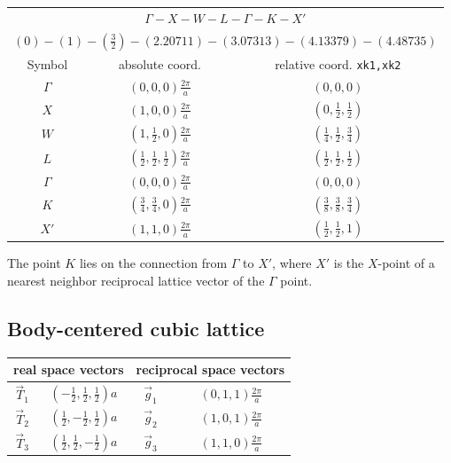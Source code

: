 \documentclass[final,12pt,makeidx,DIV=calc]{article}
\begin{document}
{{{\begin{center}
\renewcommand\arraystretch{1.5}
\begin{tabular}{|c|c|c|}
\hline
\multicolumn{3}{|c|}{$\Gamma-X-W-L-\Gamma-K-X'$}\\
\multicolumn{3}{|c|}{$(0)-(1)-(\frac{3}{2})-(2.20711)-(3.07313)-(4.13379)-(4.48735)$}\\
\hline
Symbol & absolute coord. & relative coord. \texttt{xk1,xk2}\\
\hline
$\Gamma$   & $(0,0,0) \frac{2\pi}{a}$ & $(0,0,0)$ \\ 
$X$        & $(1,0,0) \frac{2\pi}{a}$ & $(0,\frac{1}{2},\frac{1}{2})$ \\ 
$W$        & $(1,\frac{1}{2},0) \frac{2\pi}{a}$ & $(\frac{1}{4},\frac{1}{2},\frac{3}{4})$ \\ 
$L$        & $(\frac{1}{2},\frac{1}{2},\frac{1}{2}) \frac{2\pi}{a}$ & $(\frac{1}{2},\frac{1}{2},\frac{1}{2})$ \\ 
$\Gamma$   & $(0,0,0) \frac{2\pi}{a}$ & $(0,0,0)$ \\ 
$K$        & $(\frac{3}{4},\frac{3}{4},0) \frac{2\pi}{a}$ & $(\frac{3}{8},\frac{3}{8},\frac{3}{4})$ \\ 
$X'$       & $(1,1,0) \frac{2\pi}{a}$ & $(\frac{1}{2},\frac{1}{2},1)$ \\ 
\hline
\end{tabular}
\renewcommand\arraystretch{1.}
\end{center}
The point $K$ lies on the connection from $\Gamma$ to $X'$, where $X'$
is the $X$-point of a nearest neighbor reciprocal lattice vector of the
$\Gamma$ point.

\subsection{Body-centered cubic lattice}
\begin{center}
\renewcommand\arraystretch{1.5}
\begin{tabular}{||c|c||c|c||}
\hline
\multicolumn{2}{|c|}{real space vectors} &
\multicolumn{2}{|c|}{reciprocal space vectors} \\
\hline
$\vec{T}_1$ & $(-\frac{1}{2},\frac{1}{2},\frac{1}{2}) a$ &
$\vec{g}_1$ & $(0,1,1)\frac{2\pi}{a}$ \\
$\vec{T}_2$ & $(\frac{1}{2},-\frac{1}{2},\frac{1}{2}) a$ &
$\vec{g}_2$ & $(1,0,1)\frac{2\pi}{a}$ \\
$\vec{T}_3$ & $(\frac{1}{2},\frac{1}{2},-\frac{1}{2}) a$ &
$\vec{g}_3$ & $(1,1,0)\frac{2\pi}{a}$ \\
\hline
\end{tabular}
\renewcommand\arraystretch{1.}
\end{center}

}}}
\end{document}
